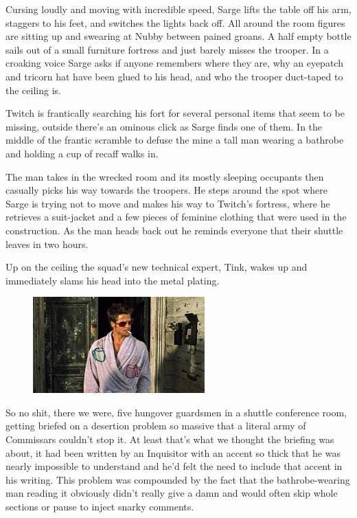 Cursing loudly and moving with incredible speed, Sarge lifts the table off his arm, staggers to his feet, and switches the lights back off. 
All around the room figures are sitting up and swearing at Nubby between pained groans. 
A half empty bottle sails out of a small furniture fortress and just barely misses the trooper. 
In a croaking voice Sarge asks if anyone remembers where they are, why an eyepatch and tricorn hat have been glued to his head, and who the trooper duct-taped to the ceiling is.

Twitch is frantically searching his fort for several personal items that seem to be missing, outside there's an ominous click as Sarge finds one of them. 
In the middle of the frantic scramble to defuse the mine a tall man wearing a bathrobe and holding a cup of recaff walks in.

The man takes in the wrecked room and its mostly sleeping occupants then casually picks his way towards the troopers. 
He steps around the spot where Sarge is trying not to move and makes his way to Twitch's fortress, where he retrieves a suit-jacket and a few pieces of feminine clothing that were used in the construction. 
As the man heads back out he reminds everyone that their shuttle leaves in two hours.

Up on the ceiling the squad's new technical expert, Tink, wakes up and immediately slams his head into the metal plating.



\begin{figure}
	\begin{center}
		\includegraphics[width=\figwidth]{pics/9/3.png}
	\end{center}
\end{figure}
So no shit, there we were, five hungover guardsmen in a shuttle conference room, getting briefed on a desertion problem so massive that a literal army of Commissars couldn't stop it. 
At least that's what we thought the briefing was about, it had been written by an Inquisitor with an accent so thick that he was nearly impossible to understand and he'd felt the need to include that accent in his writing. 
This problem was compounded by the fact that the bathrobe-wearing man reading it obviously didn't really give a damn and would often skip whole sections or pause to inject snarky comments.

